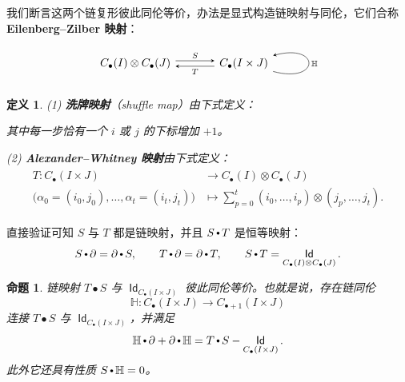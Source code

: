 \documentclass[11pt,a4paper]{article}
\renewcommand{\emph}[1]{{\bfseries #1}}
\DeclareMathOperator{\id}{\mathsf{Id}}
\DeclareMathOperator{\comp}{\vcenter{\hbox{\scalebox{0.65}{$\bullet$}}}}
\theoremstyle{cnth}
\newtheorem{defn}[thm]{定义}
\newtheorem{prop}[thm]{命题}
\begin{document}
我们断言这两个链复形彼此同伦等价，办法是显式构造链映射与同伦，它们合称
\emph{Eilenberg--Zilber 映射}：
\begin{equation}\label{eqn:EZMaps}
\begin{tikzcd}[arrow style=tikz,>=stealth,row sep=2.5em,column sep=3.5em]
C_{\bullet}(I)\otimes C_{\bullet}(J)
  \arrow[r, shift left, "S"]
&
C_{\bullet}(I\times J)
  \arrow[l, shift left, "T"]
  \arrow[loop right, <-, "\mathbb{H}"]
\end{tikzcd}
\end{equation}

\begin{defn}\label{defn:EZMaps}
(1) \emph{洗牌映射}（shuffle map）由下式定义：
\begin{center}
\end{center}
其中每一步恰有一个 $i$ 或 $j$ 的下标增加 $+1$。

\noindent
(2) \emph{Alexander--Whitney 映射}由下式定义：
\begin{align*}
\begin{split}
T:
C_{\bullet}(I\times J)
&\rightarrow
C_{\bullet}(I)\otimes C_{\bullet}(J)
\\[0mm]
\big(\alpha_0=(i_0,j_0),\dots,\alpha_t=(i_t,j_t)\big)
&\mapsto
\sum_{p=0}^t
(i_0,\dots,i_p)\otimes(j_p,\dots,j_t).
\end{split}
\end{align*}
\end{defn}

直接验证可知 $S$ 与 $T$ 都是链映射，并且 $S\comp T$ 是恒等映射：
$$
S\comp \partial=\partial \comp S,
\qquad
T\comp \partial=\partial \comp T,
\qquad
S\comp T=\id_{C_{\bullet}(I)\otimes C_{\bullet}(J)}.
$$

\begin{prop}\label{prp:chain-homotopy-TS}
链映射 $T\bullet S$ 与 $\id_{C_{\bullet}(I\times J)}$ 彼此同伦等价。也就是说，存在链同伦
$$
\mathbb{H}:
C_{\bullet}(I\times J)
\rightarrow
C_{\bullet+1}(I\times J)
$$
连接 $T\bullet S$ 与 $\id_{C_{\bullet}(I\times J)}$，并满足
$$
\mathbb{H}\comp \partial+\partial\comp \mathbb{H}
=
T\comp S-
\id_{C_{\bullet}(I\times J)}.
$$
此外它还具有性质 $S\comp \mathbb{H}=0$。
\end{prop}
\end{document}
